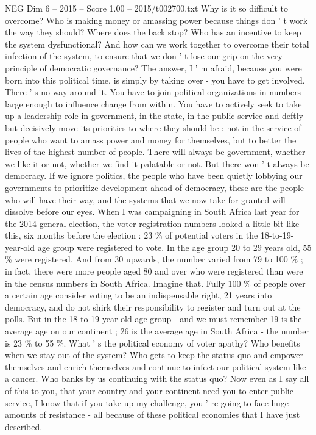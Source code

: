 \begin{textsample}{NEG Dim 6 – 2015 – Score 1.00 – 2015/t002700.txt}
Why is it so difficult to overcome?
Who is making money or amassing power because things don ' t work the way they should?
Where does the back stop?
Who has an incentive to keep the system dysfunctional?
And how can we work together to overcome their total infection of the system, to ensure that we don ' t lose our grip on the very principle of democratic governance?
The answer, I ' m afraid, because you were born into this political time, is simply by taking over - you have to get involved.
There ' s no way around it.
You have to join political organizations in numbers large enough to influence change from within.
You have to actively seek to take up a leadership role in government, in the state, in the public service and deftly but decisively move its priorities to where they should be : not in the service of people who want to amass power and money for themselves, but to better the lives of the highest number of people.
There will always be government, whether we like it or not, whether we find it palatable or not.
But there won ' t always be democracy.
If we ignore politics, the people who have been quietly lobbying our governments to prioritize development ahead of democracy, these are the people who will have their way, and the systems that we now take for granted will dissolve before our eyes.
When I was campaigning in South Africa last year for the 2014 general election, the voter registration numbers looked a little bit like this, six months before the election : 23 \% of potential voters in the 18-to-19-year-old age group were registered to vote.
In the age group 20 to 29 years old, 55 \% were registered.
And from 30 upwards, the number varied from 79 to 100 \% ; in fact, there were more people aged 80 and over who were registered than were in the census numbers in South Africa.
Imagine that.
Fully 100 \% of people over a certain age consider voting to be an indispensable right, 21 years into democracy, and do not shirk their responsibility to register and turn out at the polls.
But in the 18-to-19-year-old age group - and we must remember 19 is the average age on our continent ; 26 is the average age in South Africa - the number is 23 \% to 55 \%.
What ' s the political economy of voter apathy?
Who benefits when we stay out of the system?
Who gets to keep the status quo and empower themselves and enrich themselves and continue to infect our political system like a cancer.
Who banks by us continuing with the status quo?
Now even as I say all of this to you, that your country and your continent need you to enter public service, I know that if you take up my challenge, you ' re going to face huge amounts of resistance - all because of these political economies that I have just described.

\end{textsample}
